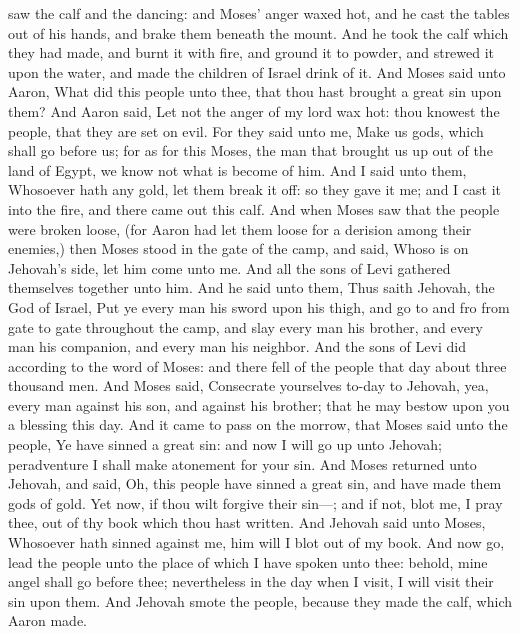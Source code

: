 saw the calf and the dancing: and Moses’ anger waxed hot, and he cast the tables out of his hands, and brake them beneath the mount. And he took the calf which they had made, and burnt it with fire, and ground it to powder, and strewed it upon the water, and made the children of Israel drink of it.  And Moses said unto Aaron, What did this people unto thee, that thou hast brought a great sin upon them? And Aaron said, Let not the anger of my lord wax hot: thou knowest the people, that they are set on evil. For they said unto me, Make us gods, which shall go before us; for as for this Moses, the man that brought us up out of the land of Egypt, we know not what is become of him. And I said unto them, Whosoever hath any gold, let them break it off: so they gave it me; and I cast it into the fire, and there came out this calf.  And when Moses saw that the people were broken loose, (for Aaron had let them loose for a derision among their enemies,) then Moses stood in the gate of the camp, and said, Whoso is on Jehovah’s side, let him come unto me. And all the sons of Levi gathered themselves together unto him. And he said unto them, Thus saith Jehovah, the God of Israel, Put ye every man his sword upon his thigh, and go to and fro from gate to gate throughout the camp, and slay every man his brother, and every man his companion, and every man his neighbor. And the sons of Levi did according to the word of Moses: and there fell of the people that day about three thousand men. And Moses said, Consecrate yourselves to-day to Jehovah, yea, every man against his son, and against his brother; that he may bestow upon you a blessing this day.  And it came to pass on the morrow, that Moses said unto the people, Ye have sinned a great sin: and now I will go up unto Jehovah; peradventure I shall make atonement for your sin. And Moses returned unto Jehovah, and said, Oh, this people have sinned a great sin, and have made them gods of gold. Yet now, if thou wilt forgive their sin—; and if not, blot me, I pray thee, out of thy book which thou hast written. And Jehovah said unto Moses, Whosoever hath sinned against me, him will I blot out of my book. And now go, lead the people unto the place of which I have spoken unto thee: behold, mine angel shall go before thee; nevertheless in the day when I visit, I will visit their sin upon them. And Jehovah smote the people, because they made the calf, which Aaron made. 

